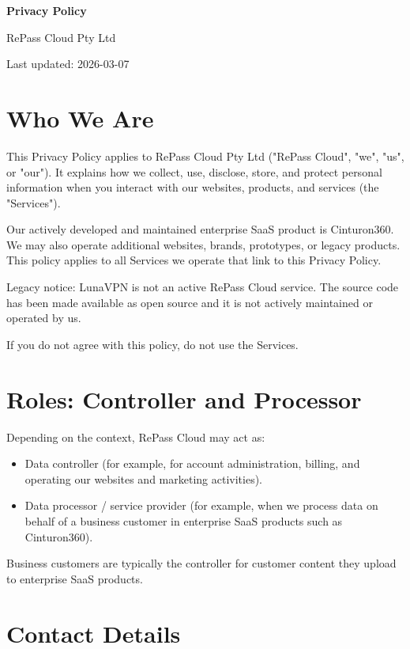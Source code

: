 \documentclass[11pt]{article}
\begin{document}
{\LARGE \textbf{Privacy Policy}}

\vspace{4pt}
RePass Cloud Pty Ltd

\vspace{2pt}
Last updated: 2026-03-07

\vspace{12pt}

\section{Who We Are}

This Privacy Policy applies to RePass Cloud Pty Ltd ("RePass Cloud", "we", "us", or "our"). It explains how we collect, use, disclose, store, and protect personal information when you interact with our websites, products, and services (the "Services").

Our actively developed and maintained enterprise SaaS product is Cinturon360. We may also operate additional websites, brands, prototypes, or legacy products. This policy applies to all Services we operate that link to this Privacy Policy.

Legacy notice: LunaVPN is not an active RePass Cloud service. The source code has been made available as open source and it is not actively maintained or operated by us.

If you do not agree with this policy, do not use the Services.

\section{Roles: Controller and Processor}

Depending on the context, RePass Cloud may act as:

\begin{itemize}
\item Data controller (for example, for account administration, billing, and operating our websites and marketing activities).
\item Data processor / service provider (for example, when we process data on behalf of a business customer in enterprise SaaS products such as Cinturon360).
\end{itemize}

Business customers are typically the controller for customer content they upload to enterprise SaaS products.

\section{Contact Details}
\end{document}
